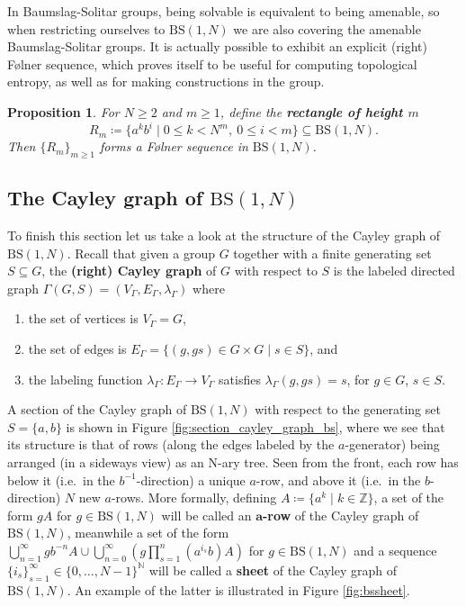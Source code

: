 \documentclass[letterpaper,10pt]{amsart}
\theoremstyle{plain}
\newtheorem{proposition}[theorem]{Proposition}
\newcommand{\BS}[1][N]{\mathrm{BS}(1,#1)}
\begin{document}
In Baumslag-Solitar groups, being solvable is equivalent to being amenable, so when restricting ourselves to $\BS$ we are also covering the amenable Baumslag-Solitar groups. It is actually possible to exhibit an explicit (right) F\o lner sequence, which proves itself to be useful for computing topological entropy, as well as for making constructions in the group.

\begin{proposition}\label{prop:rectangles_and_folner} For $N\ge 2$ and $m\ge 1$, define the \textbf{rectangle of height $m$}
	$$
	R_m\coloneqq \{a^kb^i\mid 0\le k<N^m, \ 0\le i<m  \}\subseteq \BS.
	$$
	Then $\{R_m\}_{m\ge 1}$ forms a F\o lner sequence in $\BS$.
\end{proposition}





\subsection{The Cayley graph of $\BS$}
To finish this section let us take a look at the structure of the Cayley graph of $\BS$. Recall that given a group $G$ together with a finite generating set $S\subseteq G$, the \textbf{(right) Cayley graph} of $G$ with respect to $S$ is the labeled directed graph  $\Gamma(G,S)=(V_{\Gamma},E_{\Gamma},\lambda_{\Gamma})$ where
\begin{enumerate}
	\item the set of vertices is $V_\Gamma=G$, 
	\item the set of edges is $E_{\Gamma}=\{(g,gs)\in G\times G\mid s\in S\}$, and
	\item the labeling function $\lambda_{\Gamma}:E_{\Gamma}\to V_{\Gamma}$ satisfies $\lambda_{\Gamma}(g,gs)=s$, for $g\in G$, $s\in S$.
\end{enumerate}


A section of the Cayley graph of $\BS$ with respect to the generating set $S=\{a,b\}$ is shown in Figure \ref{fig:section_cayley_graph_bs}, where we see that its structure is that of rows (along the edges labeled by the $a$-generator) being arranged (in a sideways view) as an N-ary tree. Seen from the front, each row has below it (i.e.\ in the $b^{-1}$-direction) a unique $a$-row, and above it (i.e.\ in the $b$-direction) $N$ new $a$-rows. More formally, defining $A\coloneqq\{a^k \mid k\in\mathbb{Z}\}$, a set of the form $gA$ for $g\in \BS$ will be called an $\mathbf{a}$\textbf{-row} of the Cayley graph of $\BS$, meanwhile a set of the form $\displaystyle\bigcup_{n=1}^{\infty}gb^{-n}A  \cup\bigcup_{n=0}^\infty\left( g\prod_{s=1}^{n}(a^{i_s}b)A \right)$ for $g\in \BS$ and a sequence $\{i_s\}_{s=1}^{\infty}\in \{0,\ldots,N-1\}^{\mathbb{N}}$ will be called a \textbf{sheet} of the Cayley graph of $\BS$. An example of the latter is illustrated in Figure \ref{fig:bssheet}. 
\end{document}
